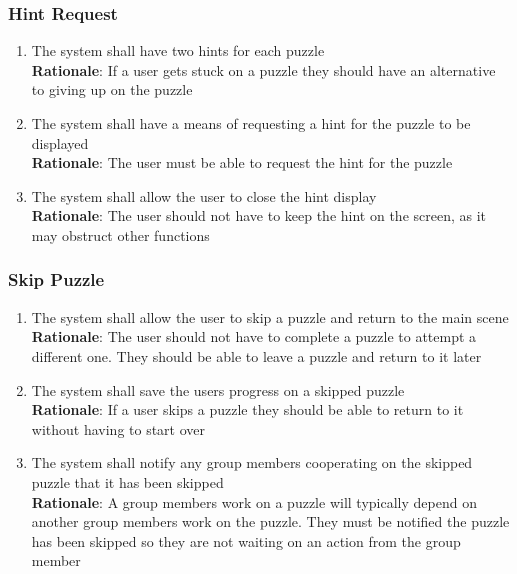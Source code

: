 \documentclass[12pt]{article}
\begin{document}
\subsubsection{Hint Request}
    \begin{enumerate}[label=HR\arabic*., series=HintRequest]
        \item The system shall have two hints for each puzzle\\
        \textbf{Rationale}: If a user gets stuck on a puzzle they should have an alternative to giving up on the puzzle
        \item The system shall have a means of requesting a hint for the puzzle to be displayed\\
        \textbf{Rationale}: The user must be able to request the hint for the puzzle
        \item The system shall allow the user to close the hint display\\
        \textbf{Rationale}: The user should not have to keep the hint on the screen, as it may obstruct other functions
    \end{enumerate}
\subsubsection{Skip Puzzle}
    \begin{enumerate}[label=SP\arabic*., series=SkipPuzzle]
        \item The system shall allow the user to skip a puzzle and return to the main scene\\
        \textbf{Rationale}: The user should not have to complete a puzzle to attempt a different one. They should be able to leave a puzzle and return to it later
        \item The system shall save the users progress on a skipped puzzle\\
        \textbf{Rationale}: If a user skips a puzzle they should be able to return to it without having to start over
        \item The system shall notify any group members cooperating on the skipped puzzle that it has been skipped\\
        \textbf{Rationale}: A group members work on a puzzle will typically depend on another group members work on the puzzle. They must be notified the puzzle has been skipped so they are not waiting on an action from the group member
    \end{enumerate}
\end{document}
